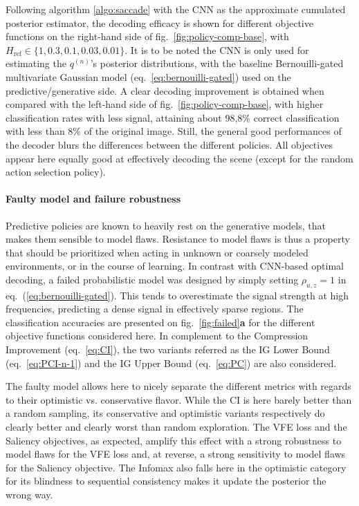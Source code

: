 \documentclass[12pt,twoside,openright]{article}
\begin{document}
Following algorithm \ref{algo:saccade} with the CNN as the approximate cumulated posterior estimator, the decoding efficacy is shown for different objective functions on the right-hand side of  fig.~\ref{fig:policy-comp-base}, with $H_\text{ref} \in \{1, 0.3, 0.1, 0.03, 0.01\}$. It is to be noted the CNN is only used for estimating the $q^{(n)}$'s posterior distributions, with the baseline Bernouilli-gated multivariate Gaussian model (eq.~\ref{eq:bernouilli-gated}) used on the predictive/generative side. A clear decoding improvement is obtained when compared with the left-hand side of fig.~\ref{fig:policy-comp-base}, with higher classification rates with less signal, attaining about 98,8\% correct classification with less than 8\% of the original image. Still, the general good performances of the decoder blurs the differences between the different policies. All objectives appear here equally good at effectively decoding the scene (except for the random action selection policy). 

\paragraph{Faulty model and failure robustness}
Predictive policies are known to heavily rest on the generative models, that makes them sensible to model flaws. Resistance to model flaws is thus a property that should be prioritized when acting in unknown or coarsely modeled environments, or in the course of learning. In contrast with CNN-based optimal decoding, a failed probabilistic model was designed by simply setting $\rho_{u,z} = 1$ in eq.~(\ref{eq:bernouilli-gated}).  This tends to overestimate the signal strength at high frequencies, predicting a dense signal in effectively sparse regions. The classification accuracies are presented on fig.~\ref{fig:failed}\textbf{a} for the different objective functions considered here. In complement to the Compression Improvement (eq.~\ref{eq:CI}), the two variants referred as the IG Lower Bound (eq.~\ref{eq:PCI-n-1}) and the IG Upper Bound (eq.~\ref{eq:PC}) are also considered. 

The faulty model allows here to nicely separate the different metrics with regards to their optimistic vs. conservative flavor. While the CI is here barely  better than a random sampling, its conservative and optimistic variants respectively do clearly better and clearly worst than random exploration. The VFE loss and the Saliency objectives, as expected, amplify this effect with a strong robustness to model flaws for the VFE loss and, at reverse, a strong sensitivity  to model flaws for the Saliency objective. The Infomax also falls here in the optimistic category for its blindness to sequential consistency makes it update the posterior the wrong way.
\end{document}

